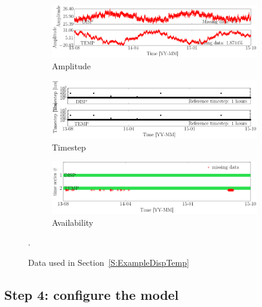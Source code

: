 \begin{figure}[h!]
\centering
\begin{subfigure}{\linewidth}
\includegraphics[width=0.9\linewidth]{./docfigs/Example_DISPTEMPSIM/preprocessed_default/ALL_AMPLITUDES.pdf} 
\caption{Amplitude}
\end{subfigure}
\begin{subfigure}{\linewidth}
\includegraphics[width=0.9\linewidth]{./docfigs/Example_DISPTEMPSIM/preprocessed_default/ALL_TIMESTEPS.pdf}
\caption{Timestep}
\end{subfigure}
\begin{subfigure}{\linewidth}
\includegraphics[width=0.9\linewidth]{./docfigs/Example_DISPTEMPSIM/preprocessed_default/AVAILABILITY.pdf}
\caption{Availability}
\end{subfigure}
\caption{Data used in Section~\ref{S:ExampleDispTemp}}.
\label{fig:DataSummaryDefaultPreProcessed2}
\end{figure}



\subsection{Step 4: configure the model}

